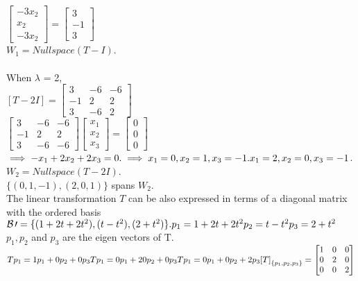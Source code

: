 \documentclass[12pt]{article}
\theoremstyle{definition}
\begin{document}
	  $
	  \begin{bmatrix}
	  -3x_2\\
	  x_2\\
	  -3x_2
	  \end{bmatrix}
	  =
	  \begin{bmatrix}
	  3\\
	  -1\\
	  3
	  \end{bmatrix}
	  $\\
	  $W_1 = Nullspace(T-I)$.\\
	  \\
	  When $\lambda$ = 2,\\
	  $
	  [T-2I] = 
	  \begin{bmatrix}
	  3 & -6 & -6\\
	  -1 & 2 & 2\\
	  3 & -6 & 2
	  \end{bmatrix}
	  $ \\
	  $
	  \begin{bmatrix}
	  3 & -6 & -6\\
	  -1 & 2 & 2\\
	  3 & -6 & -6
	  \end{bmatrix}
	  \begin{bmatrix}
	  x_1\\
	  x_2\\
	  x_3
	  \end{bmatrix}
	  =
	  \begin{bmatrix}
	  0\\
	  0\\
	  0
	  \end{bmatrix}
	  $ \\
	  $\implies
	  -x_1+2x_2+2x_3 = 0.\\
	  \implies x_1 = 0, x_2=1,x_3=-1.\\
	  x_1 = 2, x_2=0,x_3=-1$.\\
	  $W_2 = Nullspace(T-2I)$.\\
	  $\{(0,1,-1),(2,0,1)\}$ spans $W_2$.\\
	  The linear transformation $T$ can be also expressed in terms of a diagonal matrix with the ordered basis $\mathcal{B\prime}=\{(1+2t+2t^2),(t-t^2),(2+t^2)\}.\\
	  p_1 = 1+2t+2t^2\\
	  p_2 = t-t^2\\
	  p_3 = 2+t^2\\$
	  $p_1,p_2$ and $p_3$ are the eigen vectors of T.\\
	  $
	  Tp_1 = 1p_1+0p_2+0p_3\\
	  Tp_1 = 0p_1+20p_2+0p_3\\
	  Tp_1 = 0p_1+0p_2+2p_3\\
	  {[T]}_{\{p_1,p_2,p_3\}}=
	  \begin{bmatrix}
	  1 & 0 & 0\\
	  0 & 2 & 0\\
	  0 & 0 & 2
	  \end{bmatrix}
	  $
\end{document}
